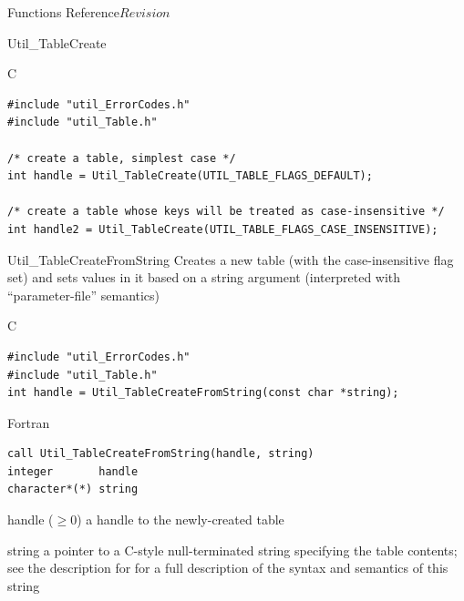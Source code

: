 \begin{cactuspart}{ Functions Reference}{}{$Revision$}
\begin{FunctionDescription}{Util\_TableCreate}
\begin{ExampleSection}
\begin{Example}{C}
\begin{verbatim}
#include "util_ErrorCodes.h"
#include "util_Table.h"

/* create a table, simplest case */
int handle = Util_TableCreate(UTIL_TABLE_FLAGS_DEFAULT);

/* create a table whose keys will be treated as case-insensitive */
int handle2 = Util_TableCreate(UTIL_TABLE_FLAGS_CASE_INSENSITIVE);
\end{verbatim}
\end{Example}
\end{ExampleSection}
\end{FunctionDescription}


\begin{FunctionDescription}{Util\_TableCreateFromString}
\label{Util-TableCreateFromString}
Creates a new table (with the case-insensitive flag set) and sets
values in it based on a string argument (interpreted with
``parameter-file'' semantics)

\begin{SynopsisSection}
\begin{Synopsis}{C}
\begin{verbatim}
#include "util_ErrorCodes.h"
#include "util_Table.h"
int handle = Util_TableCreateFromString(const char *string);
\end{verbatim}
\end{Synopsis}
\begin{Synopsis}{Fortran}
\begin{verbatim}
call Util_TableCreateFromString(handle, string)
integer       handle
character*(*) string
\end{verbatim}
\end{Synopsis}
\end{SynopsisSection}

\begin{ResultSection}
\begin{Result}{handle ($\ge 0$)}
a handle to the newly-created table
\end{Result}
\end{ResultSection}

\begin{ParameterSection}
\begin{Parameter}{string}
a pointer to a C-style null-terminated string specifying the table
contents; see the description for 
for a full description of the syntax and semantics of this string
\end{Parameter}
\end{ParameterSection}


\end{FunctionDescription}
\end{cactuspart}
